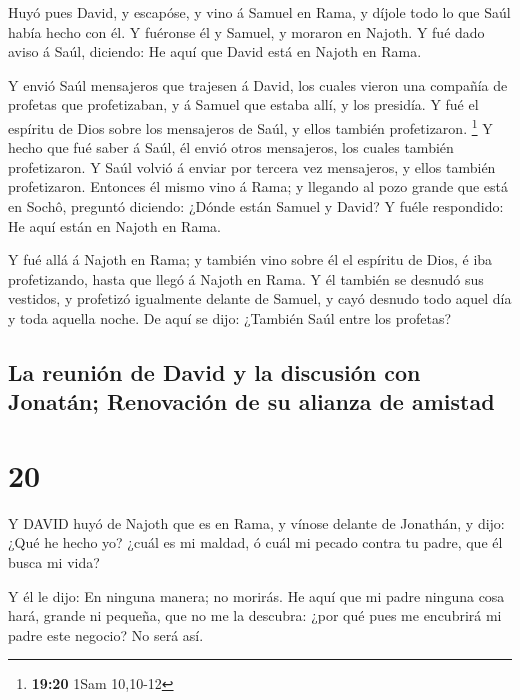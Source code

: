  Huyó pues David, y escapóse, y vino á Samuel en Rama, y
díjole todo lo que Saúl había hecho con él. Y fuéronse él y Samuel, y
moraron en Najoth.  Y fué dado aviso á Saúl, diciendo: He
aquí que David está en Najoth en Rama.

 Y envió Saúl mensajeros que trajesen á David, los cuales
vieron una compañía de profetas que profetizaban, y á Samuel que estaba
allí, y los presidía. Y fué el espíritu de Dios sobre los mensajeros de
Saúl, y ellos también profetizaron. \footnote{\textbf{19:20} 1Sam
  10,10-12}  Y hecho que fué saber á Saúl, él envió otros
mensajeros, los cuales también profetizaron. Y Saúl volvió á enviar por
tercera vez mensajeros, y ellos también profetizaron. 
Entonces él mismo vino á Rama; y llegando al pozo grande que está en
Sochô, preguntó diciendo: ¿Dónde están Samuel y David? Y fuéle
respondido: He aquí están en Najoth en Rama.

 Y fué allá á Najoth en Rama; y también vino sobre él el
espíritu de Dios, é iba profetizando, hasta que llegó á Najoth en Rama.
 Y él también se desnudó sus vestidos, y profetizó
igualmente delante de Samuel, y cayó desnudo todo aquel día y toda
aquella noche. De aquí se dijo: ¿También Saúl entre los profetas?

\hypertarget{la-reuniuxf3n-de-david-y-la-discusiuxf3n-con-jonatuxe1n-renovaciuxf3n-de-su-alianza-de-amistad}{%
\subsection{La reunión de David y la discusión con Jonatán; Renovación
de su alianza de
amistad}\label{la-reuniuxf3n-de-david-y-la-discusiuxf3n-con-jonatuxe1n-renovaciuxf3n-de-su-alianza-de-amistad}}

\hypertarget{section-19}{%
\section{20}\label{section-19}}

 Y DAVID huyó de Najoth que es en Rama, y vínose delante de
Jonathán, y dijo: ¿Qué he hecho yo? ¿cuál es mi maldad, ó cuál mi pecado
contra tu padre, que él busca mi vida?

 Y él le dijo: En ninguna manera; no morirás. He aquí que mi
padre ninguna cosa hará, grande ni pequeña, que no me la descubra: ¿por
qué pues me encubrirá mi padre este negocio? No será así.

